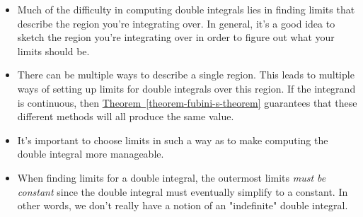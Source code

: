 \documentclass[10pt,]{book}
\theoremstyle{ptxplainnotitle}
\theoremstyle{ptxplaintitle}
\theoremstyle{ptxplainnotitle}
\theoremstyle{ptxplaintitle}
\theoremstyle{ptxplainnotitle}
\theoremstyle{ptxplaintitle}
\theoremstyle{ptxdefinitionnotitle}
\theoremstyle{ptxdefinitiontitle}
\theoremstyle{ptxdefinitionnotitle}
\theoremstyle{ptxdefinitiontitle}
\theoremstyle{ptxdefinitionnotitle}
\theoremstyle{ptxdefinitiontitle}
\theoremstyle{ptxdefinitionnotitle}
\theoremstyle{ptxdefinitiontitle}
\theoremstyle{ptxdefinitionnotitle}
\theoremstyle{ptxdefinitiontitle}
\numberwithin{equation}{section}
\begin{document}
\begin{itemize}[label=\textbullet]
\item{}Much of the difficulty in computing double integrals lies in finding limits that describe the region you're integrating over. In general, it's a good idea to sketch the region you're integrating over in order to figure out what your limits should be.%
\item{}There can be multiple ways to describe a single region. This leads to multiple ways of setting up limits for double integrals over this region. If the integrand is continuous, then \hyperref[theorem-fubini-s-theorem]{Theorem~\ref{theorem-fubini-s-theorem}} guarantees that these different methods will all produce the same value.%
\item{}It's important to choose limits in such a way as to make computing the double integral more manageable.%
\item{}When finding limits for a double integral, the outermost limits \emph{must be constant} since the double integral must eventually simplify to a constant. In other words, we don't really have a notion of an "indefinite" double integral.%
\end{itemize}
%
\end{document}
